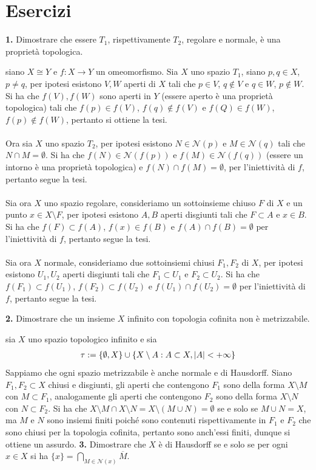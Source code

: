 \documentclass[oneside, 11pt]{amsbook}
\makeatletter
\newcommand{\0}{{(0)}}
\newcommand{\3}{{(3)}}
\theoremstyle{colonplain}
\theoremstyle{colondefinition}
\theoremstyle{colonremark}
\numberwithin{equation}{chapter}
\renewcommand{\proofname}{Dimostrazione}
\renewenvironment{proof}[1][\proofname]{\par
  \pushQED{\qed}%
  \normalfont \topsep6\p@\@plus6\p@\relax
  \trivlist
  \item[\hskip\labelsep\bfseries #1:]\ignorespaces
}{%
  \popQED\endtrivlist\@endpefalse
}
\makeatother
\begin{document}
\section{Esercizi}
\textbf{1.} Dimostrare che essere $T_1$, rispettivamente $T_2$, regolare e normale, è una proprietà topologica.
\begin{proof}
siano $X \cong Y$ e $f : X \longrightarrow Y$ un omeomorfismo. Sia $X$ uno spazio $T_1$, siano $p, q \in X$, $p \neq q$, per ipotesi esistono $V, W$ aperti di $X$ tali che $p \in V$, $q \not\in V$ e $q \in W$, $p \not\in W$. Si ha che $f(V), f(W)$ sono aperti in $Y$ (essere aperto è una proprietà topologica) tali che $f(p) \in f(V)$, $f(q) \not\in f(V)$ e $f(Q) \in f(W)$, $f(p) \not\in f(W)$, pertanto si ottiene la tesi. \\ \\
Ora sia $X$ uno spazio $T_2$, per ipotesi esistono $N \in \mathcal{N}(p)$ e $M \in \mathcal{N}(q)$ tali che $N \cap M = \emptyset$. Si ha che $f(N) \in \mathcal{N}(f(p))$ e $f(M) \in \mathcal{N}(f(q))$ (essere un intorno è una proprietà topologica) e $f(N) \cap f(M) = \emptyset$, per l'iniettività di $f$, pertanto segue la tesi. \\ \\
Sia ora $X$ uno spazio regolare, consideriamo un sottoinsieme chiuso $F$ di $X$ e un punto $x \in X \setminus F$, per ipotesi esistono $A, B$ aperti disgiunti tali che $F \subset A$ e $x \in B$. Si ha che $f(F) \subset f(A)$, $f(x) \in f(B)$ e $f(A) \cap f(B) = \emptyset$ per l'iniettività di $f$, pertanto segue la tesi. \\ \\
Sia ora $X$ normale, consideriamo due sottoinsiemi chiusi $F_1, F_2$ di $X$, per ipotesi esistono $U_1, U_2$ aperti disgiunti tali che $F_1 \subset U_1$ e $F_2 \subset U_2$. Si ha che $f(F_1) \subset f(U_1)$, $f(F_2) \subset f(U_2)$ e $f(U_1) \cap f(U_2) = \emptyset$ per l'iniettività di $f$, pertanto segue la tesi.
\end{proof}

\textbf{2.} Dimostrare che un insieme $X$ infinito con topologia cofinita non è metrizzabile.
\begin{proof}
sia $X$ uno spazio topologico infinito e sia 
\begin{align}
    \tau := \{ \emptyset, X \} \cup \{ X \setminus A : A \subset X, |A| < +\infty \} \notag
\end{align}
Sappiamo che ogni spazio metrizzabile è anche normale e di Hausdorff. Siano $F_1, F_2 \subset X$ chiusi e disgiunti, gli aperti che contengono $F_1$ sono della forma $X \setminus M$ con $M \subset F_1$, analogamente gli aperti che contengono $F_2$ sono della forma $X \setminus N$ con $N \subset F_2$. Si ha che $X \setminus M \cap X \setminus N = X \setminus (M \cup N) = \emptyset$ se e solo se $M \cup N = X$, ma $M$ e $N$ sono insiemi finiti poiché sono contenuti rispettivamente in $F_1$ e $F_2$ che sono chiusi per la topologia cofinita, pertanto sono anch'essi finiti, dunque si ottiene un assurdo.
\end{proof}
\textbf{3.} Dimostrare che $X$ è di Hausdorff se e solo se per ogni $x \in X$ si ha $\{ x \} = \bigcap_{M \in \mathcal{N}(x)} \overline{M}$. \\
\end{document}
